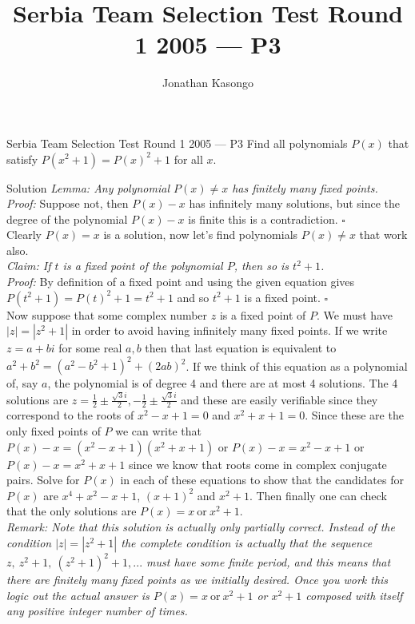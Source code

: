 \documentclass{article}
\author{Jonathan Kasongo}
\title{Serbia Team Selection Test Round 1 2005 --- P3}
\begin{document}
\maketitle

\begin{problem}{Serbia Team Selection Test Round 1 2005 --- P3}
Find all polynomials $P\left(x\right)$ that satisfy
$P\left(x^2+1\right) = P\left(x\right)^2 + 1$ for all $x$.
\end{problem}

\begin{solution}{Solution}
\textit{Lemma: Any polynomial $P(x) \neq x$ has finitely many fixed
points.}\\

\textit{Proof:}
Suppose not, then $P(x) - x$ has infinitely many solutions,
but since the degree of the polynomial $P(x) - x$ is finite this is a
contradiction. $\square$ \\

Clearly $P(x) = x$ is a solution, now let's find polynomials $P(x) \neq x$
that work also. \\

\textit{Claim: If $t$ is a fixed point of the polynomial $P$, then so
is $t^2 + 1$.}\\

\textit{Proof:} By definition of a fixed point and using the given equation
gives $P\left(t^2 + 1\right) = P\left(t\right)^2 + 1 = t^2 + 1$ and so
$t^2 + 1$ is a fixed point. $\square$ \\

Now suppose that some complex number $z$ is a fixed point of $P$. We must
have $|z| = |z^2 + 1|$ in order to avoid having infinitely many fixed
points. If we write $z = a + bi$ for some real $a,b$ then that last
equation is equivalent to $a^2 + b^2 = (a^2 - b^2 + 1)^2 + (2ab)^2$.
If we think of this equation as a polynomial of, say $a$, the polynomial
is of degree 4 and there are at most 4 solutions. The 4 solutions are
$z = \frac{1}{2} \pm \frac{\sqrt{3}i}{2},
-\frac{1}{2} \pm \frac{\sqrt{3}i}{2}$ and these are easily verifiable
since they correspond to the roots of $x^2 - x + 1 = 0$ and
$x^2 + x + 1 = 0$. Since these are the only fixed points of $P$ we can
write that
$
P(x) - x = (x^2 - x + 1)(x^2 + x + 1)
$
or
$
P(x) - x = x^2 - x + 1
$
or
$
P(x) - x = x^2 + x + 1
$
since we know that roots come in complex conjugate pairs. Solve for
$P(x)$ in each of these equations to show that the candidates for $P(x)$
are $x^4 + x^2 - x + 1$, $(x+1)^2$ and $x^2 + 1$. Then finally one can
check that the only solutions are $P(x) = x \ \text{or}\
  x^2 + 1$.\\

\textit{Remark: Note that this solution is actually only partially
correct. Instead of the condition $|z| = |z^2 + 1|$ the complete condition
is actually that
the sequence $z, \ z^2 + 1, \ (z^2 + 1)^2 + 1, ...$ must have some finite
period, and this means that there are finitely many fixed points as we
initially
desired. Once you work this logic out the actual answer is
$P(x) = x \ \text{or} \ x^2 + 1$ or $x^2 + 1$ composed with itself any
positive integer number of times.}
\end{solution}
\end{document}
